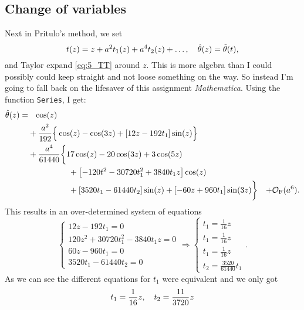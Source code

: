 \documentclass[11pt,letter, swedish, english
]{article}
\begin{document}
\subsection{Change of variables}
\newcommand{\HT}{\ensuremath{\hat{\theta}}}
Next in Pritulo's method, we set
\begin{equation}
t(z)=z+a^2t_1(z)+a^4t_2(z)+\ldots\qcomma
\HT(z)=\TT(t),
\end{equation}
and Taylor expand \eqref{eq:5_TT} around $z$. This is more algebra
than I could possibly could keep straight and not loose something on
the way. So instead I'm going to fall back on the lifesaver of this
assignment \textit{Mathematica}. Using the function \texttt{Series}, I
get:
\begin{equation}\label{eq:5_HT}
\begin{aligned}
\HT(z)=&\phantom{+}\cos(z)\\
&+\frac{a^2}{192}\Big\{\cos(z)-\cos(3z) + [12z-192t_1]\sin(z)\Big\}\\
&+\frac{a^4}{61440}
\bigg\{
17\cos(z)-20\cos(3z)+3\cos(5z)\\
&\hspace{50pt}
+\qty[-120t^2-30720t_1^2+3840t_1z]\cos(z)\\
&\hspace{50pt}
+\qty[3520t_1-61440t_2]\sin(z)
+\qty[-60z+960t_1]\sin(3z)
\bigg\}
 &+ \mathcal{O}_\text{F}(a^6).
\end{aligned}
\end{equation}
This results in an over-determined system of equations
\begin{equation}
\begin{cases}
12z-192t_1=0\\
120z^2+30720t_1^2-3840t_1z=0\\
60z-960t_1=0\\
3520t_1-61440t_2=0
\end{cases}
\Longrightarrow
\begin{cases}
t_1=\frac{1}{16}z\\
t_1=\frac{1}{16}z\\
t_1=\frac{1}{16}z\\
t_2=\frac{3520}{61440}t_1%
\end{cases}.
\end{equation}
As we can see the different equations for $t_1$ were equivalent and we
only got
\begin{equation}
t_1=\frac{1}{16}z\qcomma
t_2=\frac{11}{3720}z
\end{equation}
\end{document}
